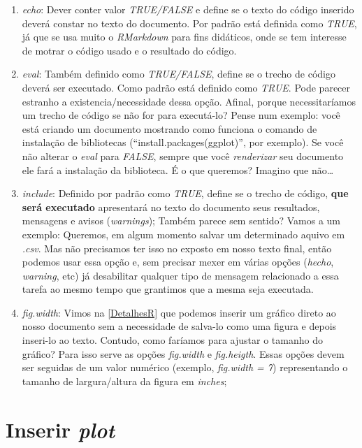 \documentclass[]{book}
\providecommand{\tightlist}{%
  \setlength{\itemsep}{0pt}\setlength{\parskip}{0pt}}
\begin{document}
\begin{enumerate}
\def\labelenumi{\arabic{enumi}.}
\tightlist
\item
  \emph{echo}: Dever conter valor \emph{TRUE/FALSE} e define se o texto do código inserido deverá constar no texto do documento. Por padrão está definida como \emph{TRUE}, já que se usa muito o \emph{RMarkdown} para fins didáticos, onde se tem interesse de motrar o código usado e o resultado do código.\\
\item
  \emph{eval}: Também definido como \emph{TRUE/FALSE}, define se o trecho de código deverá ser executado. Como padrão está definido como \emph{TRUE}. Pode parecer estranho a existencia/necessidade dessa opção. Afinal, porque necessitaríamos um trecho de código se não for para executá-lo? Pense num exemplo: você está criando um documento mostrando como funciona o comando de instalação de bibliotecas (``install.packages(ggplot)'', por exemplo). Se você não alterar o \emph{eval} para \emph{FALSE}, sempre que você \emph{renderizar} seu documento ele fará a instalação da biblioteca. É o que queremos? Imagino que não\ldots{}\\
\item
  \emph{include}: Definido por padrão como \emph{TRUE}, define se o trecho de código, \textbf{que será executado} apresentará no texto do documento seus resultados, mensagens e avisos (\emph{warnings}); Também parece sem sentido? Vamos a um exemplo: Queremos, em algum momento salvar um determinado aquivo em \emph{.csv}. Mas não precisamos ter isso no exposto em nosso texto final, então podemos usar essa opção e, sem precisar mexer em várias opções (\emph{hecho}, \emph{warning}, etc) já desabilitar qualquer tipo de mensagem relacionado a essa tarefa ao mesmo tempo que grantimos que a mesma seja executada.\\
\item
  \emph{fig.width}: Vimos na \autoref{DetalhesR} que podemos inserir um gráfico direto ao nosso documento sem a necessidade de salva-lo como uma figura e depois inseri-lo ao texto. Contudo, como faríamos para ajustar o tamanho do gráfico? Para isso serve as opções \emph{fig.width} e \emph{fig.heigth}. Essas opções devem ser seguidas de um valor numérico (exemplo, \emph{fig.width = 7}) representando o tamanho de largura/altura da figura em \emph{inches};
\end{enumerate}

\hypertarget{InserirPlot}{%
\chapter{\texorpdfstring{Inserir \emph{plot}}{Inserir plot}}\label{InserirPlot}}
\end{document}
